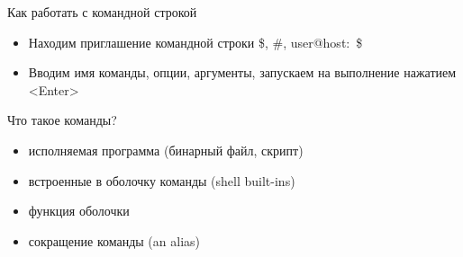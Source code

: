 \begin{frame}[fragile]{Как работать с командной строкой}
  \begin{itemize}
    \item 
	Находим приглашение командной строки
	\$, \#, user@host:~\$
    \item
	Вводим имя команды, опции, аргументы, запускаем на выполнение нажатием <Enter>
   \end{itemize}

	Что такое команды?
  \begin{itemize}
    \item исполняемая программа (бинарный файл, скрипт)
    \item встроенные в оболочку команды (shell built-ins)
    \item функция оболочки
    \item сокращение команды (an alias) 
  \end{itemize}
\end{frame}

